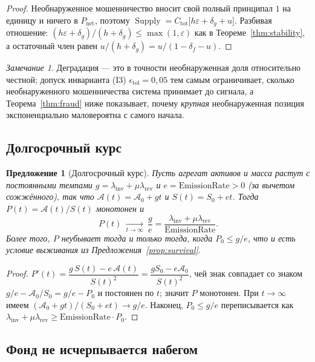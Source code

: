 \documentclass[11pt]{article}
\theoremstyle{plain}
\newtheorem{proposition}{Предложение}
\theoremstyle{definition}
\theoremstyle{remark}
\newtheorem{remark}{Замечание}
\newcommand{\Supply}{\operatorname{Supply}}
\begin{document}
\begin{proof}
Необнаруженное мошенничество вносит свой полный принципал $1$ на единицу и ничего в $P_{\mathrm{net}}$, поэтому $\Supply=C_{\mathrm{tot}}\bigl[h\varepsilon+\delta_g+u\bigr]$. Разбивая отношение: $(h\varepsilon+\delta_g)/(h+\delta_g)\le\max(1,\varepsilon)$ как в Теореме~\ref{thm:stability}, а остаточный член равен $u/(h+\delta_g)=u/(1-\delta_f-u)$.
\end{proof}

\begin{remark}
Деградация --- это в точности необнаруженная доля относительно честной; допуск инварианта (I3) $\epsilon_{\mathrm{tol}}=0{,}05$ тем самым ограничивает, сколько необнаруженного мошенничества система принимает до сигнала, а Теорема~\ref{thm:fraud} ниже показывает, почему \emph{крупная} необнаруженная позиция экспоненциально маловероятна с самого начала.
\end{remark}

\subsection{Долгосрочный курс}

\begin{proposition}[Долгосрочный курс]\label{prop:longrun}
Пусть агрегат активов и масса растут с постоянными темпами $g=\lambda_{\mathrm{inv}}+\mu\lambda_{\mathrm{rev}}$ и $e=\mathrm{EmissionRate}>0$ (за вычетом сожжённого), так что $\mathcal{A}(t)=\mathcal{A}_0+gt$ и $S(t)=S_0+et$. Тогда $P(t)=\mathcal{A}(t)/S(t)$ монотонен и
\[
P(t)\ \xrightarrow[t\to\infty]{}\ \frac{g}{e}=\frac{\lambda_{\mathrm{inv}}+\mu\lambda_{\mathrm{rev}}}{\mathrm{EmissionRate}} .
\]
Более того, $P$ неубывает тогда и только тогда, когда $P_0\le g/e$, что и есть условие выживания из Предложения~\ref{prop:survival}.
\end{proposition}

\begin{proof}
$P'(t)=\dfrac{g\,S(t)-e\,\mathcal{A}(t)}{S(t)^2}=\dfrac{gS_0-e\mathcal{A}_0}{S(t)^2}$, чей знак совпадает со знаком $g/e-\mathcal{A}_0/S_0=g/e-P_0$ и постоянен по $t$; значит $P$ монотонен. При $t\to\infty$ имеем $(\mathcal{A}_0+gt)/(S_0+et)\to g/e$. Наконец, $P_0\le g/e$ переписывается как $\lambda_{\mathrm{inv}}+\mu\lambda_{\mathrm{rev}}\ge\mathrm{EmissionRate}\cdot P_0$.
\end{proof}

\subsection{Фонд не исчерпывается набегом}
\end{document}
